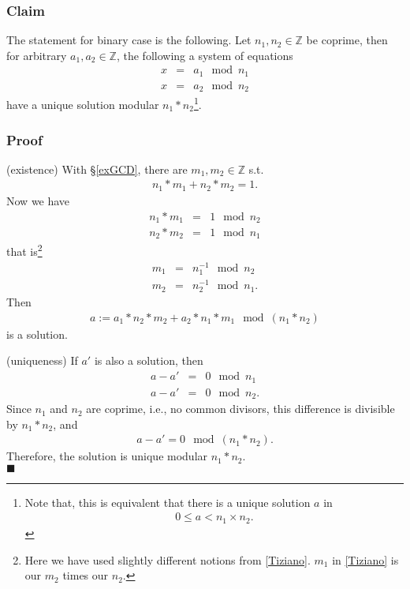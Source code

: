 \documentclass[11pt]{book}
\begin{document}
\subsubsection{Claim}
The statement for binary case is the following.
Let $n_1, n_2 \in \mathbb{Z}$ be coprime, then for arbitrary $a_1,a_2 \in \mathbb{Z}$, the following a system of equations
\begin{eqnarray}
x &=& a_1 \mod n_1\\
x &=& a_2 \mod n_2
\end{eqnarray}
have a unique solution modular $n_1*n_2$\footnote{
Note that, this is equivalent that there is a unique solution $a$ in
\begin{eqnarray}
0 \leq a < n_1\times n_2.
\end{eqnarray}
}.

\subsubsection{Proof}
(existence) With \S\ref{exGCD}, there are $m_1,m_2 \in \mathbb{Z}$ s.t.
\begin{eqnarray}
n_1 * m_1 + n_2 * m_2 = 1.
\end{eqnarray}
Now we have
\begin{eqnarray}
n_1 * m_1 &=& 1 \mod n_2 \\
n_2 * m_2 &=& 1 \mod n_1
\end{eqnarray}
that is\footnote{
Here we have used slightly different notions from \ref{Tiziano}.
$m_1$ in \ref{Tiziano} is our $m_2$ times our $n_2$.
}
\begin{eqnarray}
m_1 &=& n_1^{-1} \mod n_2 \\
m_2 &=& n_2^{-1} \mod n_1.
\end{eqnarray}
Then
\begin{eqnarray}
a := a_1 * n_2 * m_2 + a_2 * n_1 * m_1 \mod (n_1*n_2)
\end{eqnarray}
is a solution.

(uniqueness)
If $a'$ is also a solution, then
\begin{eqnarray}
a - a' &=& 0 \mod n_1 \\
a - a' &=& 0 \mod n_2.
\end{eqnarray}
Since $n_1$ and $n_2$ are coprime, i.e., no common divisors, this difference is divisible by $n_1*n_2$, and
\begin{eqnarray}
a - a' = 0 \mod (n_1 * n_2).
\end{eqnarray}
Therefore, the solution is unique modular $n_1*n_2$. \\
$\blacksquare$
\end{document}
